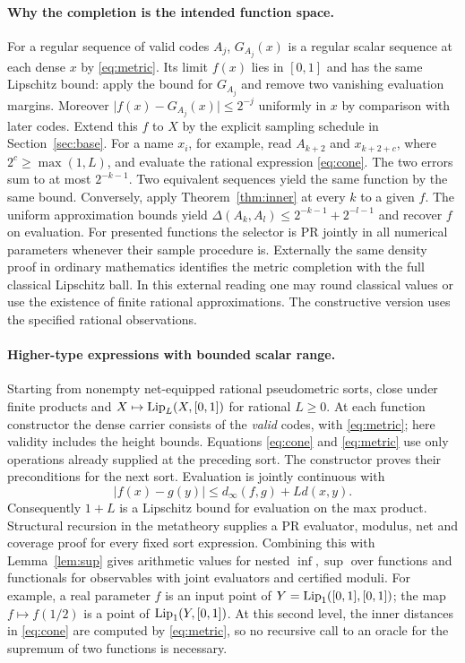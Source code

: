 \paragraph{Why the completion is the intended function space.}
For a regular sequence of valid codes $A_j$, $G_{A_j}(x)$ is a regular scalar sequence at each dense $x$ by \eqref{eq:metric}. Its limit $f(x)$ lies in $[0,1]$ and has the same Lipschitz bound: apply the bound for $G_{A_j}$ and remove two vanishing evaluation margins. Moreover $\lvert f(x)-G_{A_j}(x)\rvert\le2^{-j}$ uniformly in $x$ by comparison with later codes. Extend this $f$ to $X$ by the explicit sampling schedule in Section~\ref{sec:base}. For a name $x_i$, for example, read $A_{k+2}$ and $x_{k+2+c}$, where $2^c\ge\max(1,L)$, and evaluate the rational expression \eqref{eq:cone}. The two errors sum to at most $2^{-k-1}$. Two equivalent sequences yield the same function by the same bound. Conversely, apply Theorem~\ref{thm:inner} at every $k$ to a given $f$. The uniform approximation bounds yield $\Delta(A_k,A_l)\le2^{-k-1}+2^{-l-1}$ and recover $f$ on evaluation. For presented functions the selector is PR jointly in all numerical parameters whenever their sample procedure is. Externally the same density proof in ordinary mathematics identifies the metric completion with the full classical Lipschitz ball. In this external reading one may round classical values or use the existence of finite rational approximations. The constructive version uses the specified rational observations.

\paragraph{Higher-type expressions with bounded scalar range.}
Starting from nonempty net-equipped rational pseudometric sorts, close under finite products and $X\mapsto\operatorname{Lip}_L(X,[0,1])$ for rational $L\ge0$. At each function constructor the dense carrier consists of the \emph{valid} codes, with \eqref{eq:metric}; here validity includes the height bounds. Equations \eqref{eq:cone} and \eqref{eq:metric} use only operations already supplied at the preceding sort. The constructor proves their preconditions for the next sort. Evaluation is jointly continuous with
\[
 |f(x)-g(y)|\le d_\infty(f,g)+Ld(x,y).
\]
Consequently $1+L$ is a Lipschitz bound for evaluation on the max product. Structural recursion in the metatheory supplies a PR evaluator, modulus, net and coverage proof for every fixed sort expression. Combining this with Lemma~\ref{lem:sup} gives arithmetic values for nested $\inf,\sup$ over functions and functionals for observables with joint evaluators and certified moduli. For example, a real parameter $f$ is an input point of $Y=\operatorname{Lip}_1([0,1],[0,1])$; the map $f\mapsto f(1/2)$ is a point of $\operatorname{Lip}_1(Y,[0,1])$. At this second level, the inner distances in \eqref{eq:cone} are computed by \eqref{eq:metric}, so no recursive call to an oracle for the supremum of two functions is necessary.

